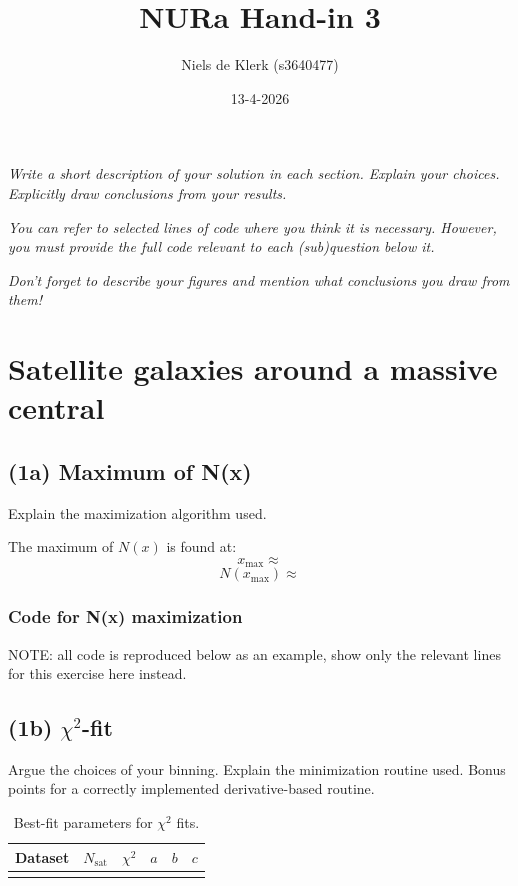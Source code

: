 \documentclass{article}
\title{NURa Hand-in 3}
\author{Niels de Klerk (s3640477)}
\date{13-4-2026}
\newcommand{\CodeDir}{Code}
\newcommand{\CalcDir}{Calculations}
\begin{document}
\maketitle

\textit{Write a short description of your solution in each section. Explain your choices. Explicitly draw conclusions from your results.}

\textit{You can refer to selected lines of code where you think it is necessary. However, you must provide the full code relevant to each (sub)question below it.}

\textit{Don't forget to describe your figures and mention what conclusions you draw from them!}


\section{Satellite galaxies around a massive central}

\subsection{(1a) Maximum of N(x)}

Explain the maximization algorithm used.

The maximum of \(N(x)\) is found at:
$$x_{\text{max}} \approx   $$
$$N(x_{\text{max}}) \approx   $$

\subsubsection{Code for N(x) maximization}
NOTE: all code is reproduced below as an example, show only the relevant lines for this exercise here instead.


\subsection{(1b) $\chi^2$-fit}

Argue the choices of your binning. Explain the minimization routine used. Bonus points for a correctly implemented derivative-based routine.

\begin{table}[H]
\centering
\caption{Best-fit parameters for $\chi^2$ fits.}
\begin{tabular}{|c|c|c|c|c|c|}
\hline
Dataset & $N_{\mathrm{sat}}$ & $\chi^2$ & $a$ & $b$ & $c$ \\
\hline
 \\
\hline
\end{tabular}
\end{table}
\end{document}
